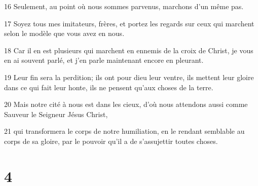 \par 16 Seulement, au point où nous sommes parvenus, marchons d'un même pas.
\par 17 Soyez tous mes imitateurs, frères, et portez les regards sur ceux qui marchent selon le modèle que vous avez en nous.
\par 18 Car il en est plusieurs qui marchent en ennemis de la croix de Christ, je vous en ai souvent parlé, et j'en parle maintenant encore en pleurant.
\par 19 Leur fin sera la perdition; ils ont pour dieu leur ventre, ils mettent leur gloire dans ce qui fait leur honte, ils ne pensent qu'aux choses de la terre.
\par 20 Mais notre cité à nous est dans les cieux, d'où nous attendons aussi comme Sauveur le Seigneur Jésus Christ,
\par 21 qui transformera le corps de notre humiliation, en le rendant semblable au corps de sa gloire, par le pouvoir qu'il a de s'assujettir toutes choses.

\chapter{4}

